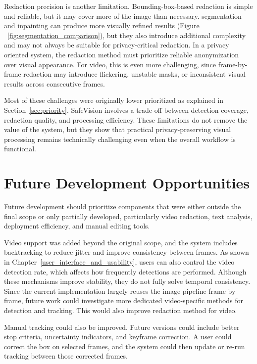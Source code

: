 Redaction precision is another limitation. Bounding-box-based redaction is simple and reliable, but it may cover more of the image than necessary. \Gls{segmentation} and \gls{inpainting} can produce more visually refined results (Figure ~\ref{fig:segmentation_comparison}), but they also introduce additional complexity and may not always be suitable for privacy-critical redaction. In a privacy oriented system, the redaction method must prioritize reliable \gls{anonymization} over visual appearance. For video, this is even more challenging, since frame-by-frame redaction may introduce flickering, unstable masks, or inconsistent visual results across consecutive frames.

Most of these challenges were originally lower prioritized as explained in Section~\ref{sec:priority}. \gls{SafeVision} involves a trade-off between detection coverage, redaction quality, and processing efficiency. These limitations do not remove the value of the system, but they show that practical privacy-preserving visual processing remains technically challenging even when the overall workflow is functional. 


\section{Future Development Opportunities}

Future development should prioritize components that were either outside the final scope or only partially developed, particularly video redaction, text analysis, deployment efficiency, and manual editing tools.

Video support was added beyond the original scope, and the system includes backtracking to reduce jitter and improve consistency between frames. As shown in Chapter~\ref{user_interface_and_usability}, users can also control the video detection rate, which affects how frequently detections are performed. Although these mechanisms improve stability, they do not fully solve temporal consistency. Since the current implementation largely reuses the image pipeline frame by frame, future work could investigate more dedicated video-specific methods for detection and tracking. This would also improve redaction method for video.

Manual tracking could also be improved. Future versions could include better stop criteria, uncertainty indicators, and keyframe correction. A user could correct the box on selected frames, and the system could then update or re-run tracking between those corrected frames. 

